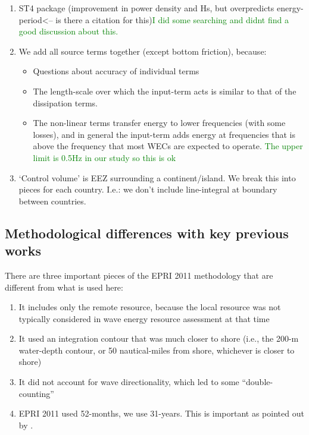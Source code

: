 \begin{enumerate}
\item ST4 package (improvement in power density and Hs, but overpredicts energy-period<-- is there a citation for this)\textcolor{green}{I did some searching and didnt find a good discussion about this.}
\item We add all source terms together (except bottom friction), because:
  \begin{itemize}
  \item Questions about accuracy of individual terms \citep{garcia-medinaWaveResourceAssessment2014}
  \item The length-scale over which the input-term acts is similar to that of the dissipation terms.
  \item The non-linear terms transfer energy to lower frequencies (with some losses), and in general the input-term adds energy at frequencies that is above the frequency that most WECs are expected to operate.  \textcolor{green}{The upper limit is 0.5Hz in our study so this is ok}
  \end{itemize}
\item ‘Control volume’ is EEZ surrounding a continent/island. We break this into pieces for each country. I.e.: we don’t include line-integral at boundary between countries.
\end{enumerate}

\subsection{Methodological differences with key previous works}
\label{sec:method:changes}


There are three important pieces of the EPRI 2011 methodology that are different from what is used here:
\begin{enumerate}
\item It includes only the remote resource, because the local resource was not typically considered in wave energy resource assessment at that time
\item It used an integration contour that was much closer to shore (i.e., the 200-m water-depth contour, or 50 nautical-miles from shore, whichever is closer to shore)
\item It did not account for wave directionality, which led to some ``double-counting'' \cite{nationalresearchcouncilEvaluationDepartmentEnergy2013}
\item EPRI 2011 used 52-months, we use 31-years. This is important as pointed out by \cite{yangCharacteristicsVariabilityNearshore2020}.
\end{enumerate}


